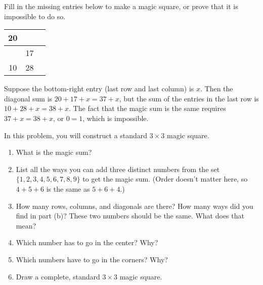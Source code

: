 \documentclass[11pt]{article}
\renewenvironment{problem}{\begin{problems}}{\end{problems}\vspace{5pt}}
\begin{document}
\begin{problem}[3 points]
Fill in the missing entries below to make a magic square, or prove that it is impossible to do so.
\begin{center}
\begin{tabular}{|c|c|c|}
\hline
20 & \phantom{00} & \phantom{00} \\ \hline
 & 17 & \\ \hline
 10 & 28 & \\ \hline
\end{tabular}
\end{center}
\end{problem}

\begin{solution}
Suppose the bottom-right entry (last row and last column) is $x$. Then the diagonal sum is $20+17+x = 37+x$,
but the sum of the entries in the last row is $10+28+x = 38+x$. The fact that the magic sum is the same
requires $37+x = 38+x$, or $0 = 1$, which is impossible.
\end{solution}


\begin{problem}[15=1+3+2+3+3+3 points]
In this problem, you will construct a standard $3 \times 3$ magic square.
\begin{enumerate}[label=(\alph*)]
\item What is the magic sum?

\item List all the ways you can add three distinct numbers from the set $\{1, 2, 3, 4, 5, 6, 7, 8, 9\}$ to get the magic sum.
(Order doesn't matter here, so $4+5+6$ is the same as $5+6+4$.)

\item How many rows, columns, and diagonals are there? How many ways did you find in part (b)?
These two numbers should be the same. What does that mean?

\item Which number has to go in the center? Why?

\item Which numbers have to go in the corners? Why?

\item Draw a complete, standard $3 \times 3$ magic square.
\end{enumerate}
\end{problem}
\end{document}
